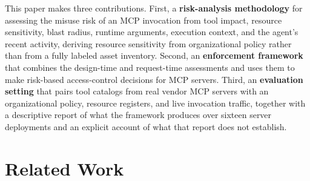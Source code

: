 \documentclass[sigconf]{acmart}
\begin{document}
This paper makes three contributions. First, a \textbf{risk-analysis methodology}
for assessing the misuse risk of an MCP invocation from tool impact, resource
sensitivity, blast radius, runtime arguments, execution context, and the agent's
recent activity, deriving resource sensitivity from organizational policy rather
than from a fully labeled asset inventory. Second, an \textbf{enforcement
framework} that combines the design-time and request-time assessments and uses
them to make risk-based access-control decisions for MCP servers. Third, an
\textbf{evaluation setting} that pairs tool catalogs from real vendor MCP servers
with an organizational policy, resource registers, and live invocation traffic,
together with a descriptive report of what the framework produces over sixteen
server deployments and an explicit account of what that report does not
establish.
%
%
%
%
\section{Related Work}
\label{sec:related}
\end{document}

